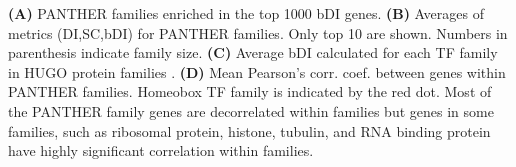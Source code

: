 \textbf{(A)} PANTHER families enriched in the top 1000 bDI genes.
\textbf{(B)} Averages of metrics (DI,SC,bDI) for PANTHER families. Only top 10 are shown. Numbers in parenthesis indicate family size. 
\textbf{(C)} Average bDI calculated for each TF family in HUGO protein families \citep{Gray_2014}. 
\textbf{(D)} Mean Pearson's corr. coef. between genes within PANTHER families. Homeobox TF family is indicated by the red dot. Most of the PANTHER family genes are decorrelated within families but genes in some families, such as ribosomal protein, histone, tubulin, and RNA binding protein have highly significant correlation within families. 
